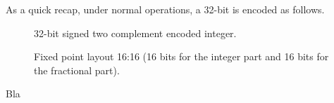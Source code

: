 \par
As a quick recap, under normal operations, a 32-bit  is encoded as follows.\\
\par
\begin{figure}[H]
 \centering
  
 \caption{32-bit signed two complement encoded integer.} \label{fig:mips}
\end{figure}

\begin{figure}[H]
 \centering
  
 \caption{Fixed point layout 16:16 (16 bits for the integer part and 16 bits for the fractional part).} \label{fig:mips}
\end{figure}

\pagebreak
Bla
\pagebreak

